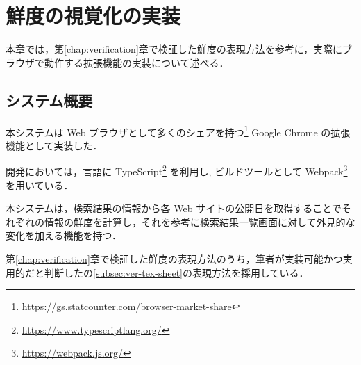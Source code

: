 \chapter{鮮度の視覚化の実装}
\label{chap:implementation}

本章では，第\ref{chap:verification}章で検証した鮮度の表現方法を参考に，実際にブラウザで動作する拡張機能の実装について述べる．

\newpage

\section{システム概要}
\label{sec:imp_system}

本システムは Web ブラウザとして多くのシェアを持つ\footnote{\url{https://gs.statcounter.com/browser-market-share}} Google Chrome の拡張機能として実装した．

開発においては，言語に TypeScript\footnote{\url{https://www.typescriptlang.org/}} を利用し, ビルドツールとして Webpack\footnote{\url{https://webpack.js.org/}} を用いている．

本システムは，検索結果の情報から各 Web サイトの公開日を取得することでそれぞれの情報の鮮度を計算し，それを参考に検索結果一覧画面に対して外見的な変化を加える機能を持つ．

第\ref{chap:verification}章で検証した鮮度の表現方法のうち，筆者が実装可能かつ実用的だと判断した\label{sec:ver-texture}の\ref{subsec:ver-tex-sheet}の表現方法を採用している．

